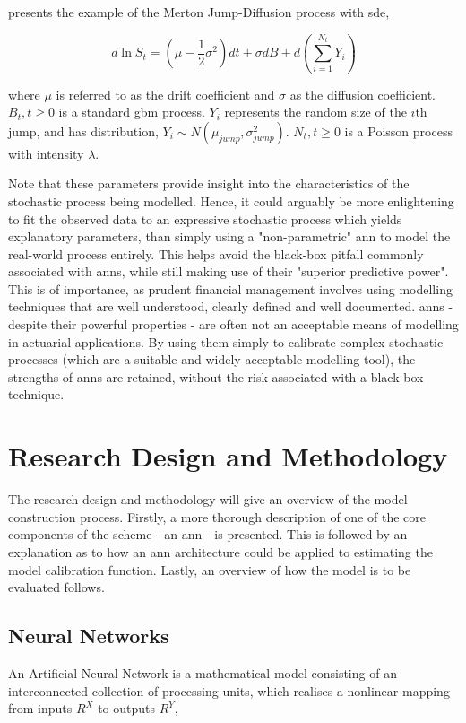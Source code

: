 \documentclass[11pt,oneside,openany,a4paper,english, report, goldenblock
]{usthesis}
\begin{document}
\citet{Mongwe} presents the example of the Merton Jump-Diffusion process with \acrshort{sde},

\begin{equation}
	d \ln{S_t}= \left( \mu - \frac{1}{2} \sigma^2 \right )dt+\sigma dB +d \left( \sum_{i=1}^{N_t} Y_i \right )
\end{equation}

where $ \mu $  is referred to as the drift coefficient and $ \sigma $ as the diffusion coefficient. $ B_{t}, t\geq 0$ is a standard \acrfull{gbm} process. $Y_i$ represents the random size of the $i$th jump, and has distribution, $Y_i \sim N \left( \mu_{jump}, \sigma_{jump}^2 \right )$. $N_t, t \geq 0$ is a Poisson process with intensity $\lambda$.


Note that these parameters provide insight into the characteristics of the stochastic process being modelled. Hence, it could arguably be more enlightening to fit the observed data to an expressive stochastic process which yields explanatory parameters, than simply using a "non-parametric" \acrshort{ann} to model the real-world process entirely. This helps avoid the black-box pitfall commonly associated with \acrshort{ann}s, while still making use of their "superior predictive power". This is of importance, as prudent financial management involves using modelling techniques that are well understood, clearly defined and well documented. \acrshort{ann}s - despite their powerful properties - are often not an acceptable means of modelling in actuarial applications. By using them simply to calibrate complex stochastic processes (which are a suitable and widely acceptable modelling tool), the strengths of \acrshort{ann}s are retained, without the risk associated with a black-box technique.

\section{Research Design and Methodology}
The research design and methodology will give an overview of the model construction process. Firstly, a more thorough description of one of the core components of the scheme - an \acrshort{ann} - is presented. This is followed by an explanation as to how an \acrshort{ann} architecture could be applied to estimating the model calibration function. Lastly, an overview of how the model is to be evaluated follows.

\subsection{Neural Networks}
An Artificial Neural Network is a mathematical model consisting of an interconnected collection of processing units, which realises a nonlinear mapping from inputs $R^X$ to outputs $R^Y$,
\end{document}
